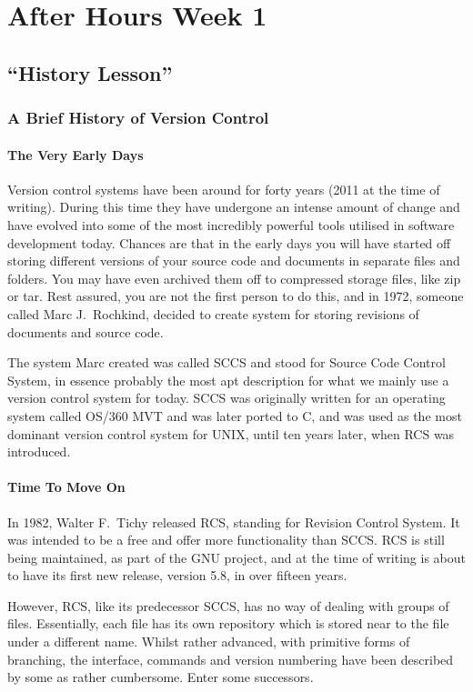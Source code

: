 \chapter{After Hours Week 1}
\section{``History Lesson''}
\subsection{A Brief History of Version Control}

\subsubsection{The Very Early Days}
Version control systems have been around for forty years (2011 at the time of writing).
During this time they have undergone an intense amount of change and have evolved into some of the most incredibly powerful tools utilised in software development today.
Chances are that in the early days you will have started off storing different versions of your source code and documents in separate files and folders.
You may have even archived them off to compressed storage files, like zip or tar.
Rest assured, you are not the first person to do this, and in 1972, someone called Marc J.\ Rochkind, decided to create system for storing revisions of documents and source code.

The system Marc created was called SCCS and stood for Source Code Control System, in essence probably the most apt description for what we mainly use a version control system for today.
SCCS was originally written for an operating system called OS/360 MVT and was later ported to C, and was used as the most dominant version control system for UNIX, until ten years later, when RCS was introduced.

\subsubsection{Time To Move On}
In 1982, Walter F.\ Tichy released RCS, standing for Revision Control System.
It was intended to be a free and offer more functionality than SCCS.
RCS is still being maintained, as part of the GNU project, and at the time of writing is about to have its first new release, version 5.8, in over fifteen years.

However, RCS, like its predecessor SCCS, has no way of dealing with groups of files.
Essentially, each file has its own repository which is stored near to the file under a different name.
Whilst rather advanced, with primitive forms of branching, the interface, commands and version numbering have been described by some as rather cumbersome.
Enter some successors.

